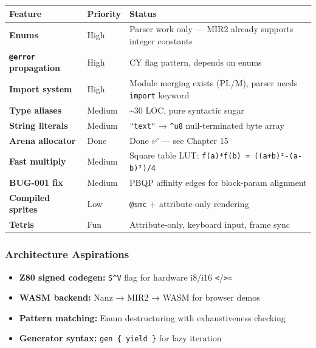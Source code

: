 \documentclass[
  11pt,
]{article}
\providecommand{\tightlist}{%
  \setlength{\itemsep}{0pt}\setlength{\parskip}{0pt}}
\begin{document}
\begin{longtable}[]{@{}
  >{\raggedright\arraybackslash}p{}
  >{\raggedright\arraybackslash}p{}
  >{\raggedright\arraybackslash}p{}@{}}
\toprule\noalign{}
\begin{minipage}[b]{\linewidth}\raggedright
Feature
\end{minipage} & \begin{minipage}[b]{\linewidth}\raggedright
Priority
\end{minipage} & \begin{minipage}[b]{\linewidth}\raggedright
Status
\end{minipage} \\
\midrule\noalign{}
\endhead
\bottomrule\noalign{}
\endlastfoot
\textbf{Enums} & High & Parser work only --- MIR2 already supports
integer constants \\
\textbf{\texttt{@error} propagation} & High & CY flag pattern, depends
on enums \\
\textbf{Import system} & High & Module merging exists (PL/M), parser
needs \texttt{import} keyword \\
\textbf{Type aliases} & Medium & \textasciitilde30 LOC, pure syntactic
sugar \\
\textbf{String literals} & Medium & \texttt{"text"} → \texttt{\^{}u8}
null-terminated byte array \\
\textbf{Arena allocator} & Done & Done ✅ --- see Chapter 15 \\
\textbf{Fast multiply} & Medium & Square table LUT:
\texttt{f(a)*f(b)\ =\ ((a+b)²-(a-b)²)/4} \\
\textbf{BUG-001 fix} & Medium & PBQP affinity edges for block-param
alignment \\
\textbf{Compiled sprites} & Low & \texttt{@smc} + attribute-only
rendering \\
\textbf{Tetris} & Fun & Attribute-only, keyboard input, frame sync \\
\end{longtable}

\subsubsection{Architecture Aspirations}\label{architecture-aspirations}

\begin{itemize}
\tightlist
\item
  \textbf{Z80 signed codegen:} \texttt{S\^{}V} flag for hardware i8/i16
  \texttt{\textless{}}/\texttt{\textgreater{}=}
\item
  \textbf{WASM backend:} Nanz → MIR2 → WASM for browser demos
\item
  \textbf{Pattern matching:} Enum destructuring with exhaustiveness
  checking
\item
  \textbf{Generator syntax:} \texttt{gen\ \{\ yield\ \}} for lazy
  iteration
\end{itemize}
\end{document}
